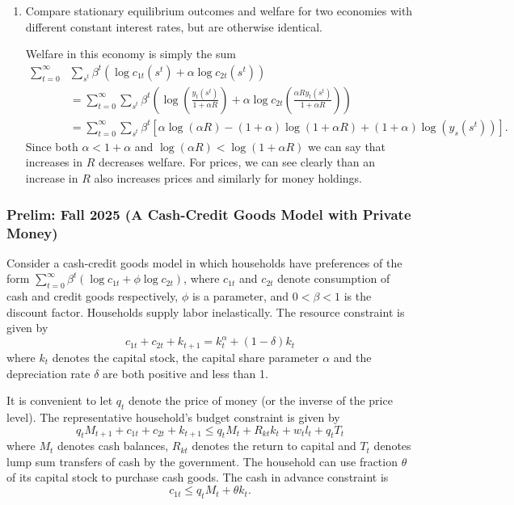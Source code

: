 \documentclass[11pt,english]{article}
\begin{document}
\begin{enumerate}[label = (\alph*)]
\begin{solution}
Keep in mind, everything I have done above assumes complete markets for bonds and money holdings!
\end{solution}
    \item Compare stationary equilibrium outcomes and welfare for two economies with different constant interest rates, but are otherwise identical.
\begin{solution}
Welfare in this economy is simply the sum 
\begin{align*}
\sum_{t=0}^\infty&\sum_{s^t}\beta^t(\log c_{1t}(s^t) + \alpha \log c_{2t}(s^t))\\
&= \sum_{t=0}^\infty\sum_{s^t}\beta^t\left(\log\left(\frac{y_t(s^t)}{1 + \alpha R}\right) + \alpha \log c_{2t}\left(\frac{\alpha R y_t(s^t)}{1 + \alpha R}\right)\right)\\
 &= \sum_{t=0}^\infty\sum_{s^t}\beta^t\left[\alpha\log(\alpha R) - (1 + \alpha)\log(1 + \alpha R) + (1 + \alpha)\log(y_s(s^t))\right].
\end{align*}
Since both $\alpha < 1 + \alpha$ and $\log(\alpha R) < \log(1 + \alpha R)$ we can say that increases in $R$ decreases welfare. For prices, we can see clearly than an increase in $R$ also increases prices and similarly for money holdings.
\end{solution}
\end{enumerate}

\subsubsection{Prelim: Fall 2025 (A Cash-Credit Goods Model with Private Money)}
Consider a cash-credit goods model in which households have preferences of the
form $\sum_{t=0}^{\infty} \beta^t (\log c_{1t} + \phi \log c_{2t})$, where
$c_{1t}$ and $c_{2t}$ denote consumption of cash and credit goods respectively,
$\phi$ is a parameter, and $0 < \beta < 1$ is the discount factor. Households
supply labor inelastically. The resource constraint is given by
\[
    c_{1t} + c_{2t} + k_{t+1} = k_t^\alpha + (1 - \delta)k_t
\]
where $k_t$ denotes the capital stock, the capital share parameter $\alpha$ and
the depreciation rate $\delta$ are both positive and less than 1.
 
It is convenient to let $q_t$ denote the price of money (or the inverse of the
price level). The representative household's budget constraint is given by
\[
    q_t M_{t+1} + c_{1t} + c_{2t} + k_{t+1}
    \leq q_t M_t + R_{kt} k_t + w_t l_t + q_t T_t
\]
where $M_t$ denotes cash balances, $R_{kt}$ denotes the return to capital and
$T_t$ denotes lump sum transfers of cash by the government. The household can
use fraction $\theta$ of its capital stock to purchase cash goods. The cash in
advance constraint is
\[
    c_{1t} \leq q_t M_t + \theta k_t.
\]
 
\end{document}
